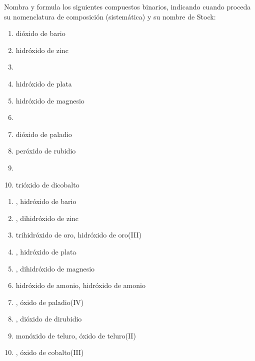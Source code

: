 \documentclass[10pt,a5paper,twoside]{article}
\begin{document}
\begin{exercise}[
    tags    = {inorgánica,compuestos binarios,óxidos,peróxidos,hidróxidos},
    topics  = {química inorgánica,formulación,nomenclatura},
    source  = {SAN Formulación, p27, e33},
  ]
  Nombra y formula los siguientes compuestos binarios, indicando cuando proceda su nomenclatura de composición (sistemática) y su nombre de Stock:

  \begin{enumerate}
    \item dióxido de bario
    \item hidróxido de zinc
    \item {}
    \item hidróxido de plata
    \item hidróxido de magnesio
    \item {}
    \item dióxido de paladio
    \item peróxido de rubidio
    \item {}
    \item trióxido de dicobalto
  \end{enumerate}
\end{exercise}

\begin{solution}
  \begin{enumerate}
    \item {}, hidróxido de bario
    \item {}, dihidróxido de zinc
    \item trihidróxido de oro, hidróxido de oro(III)
    \item {}, hidróxido de plata
    \item {}, dihidróxido de magnesio
    \item hidróxido de amonio, hidróxido de amonio
    \item {}, óxido de paladio(IV)
    \item {}, dióxido de dirubidio
    \item monóxido de teluro, óxido de teluro(II)
    \item {}, óxido de cobalto(III)
  \end{enumerate}
\end{solution}
\end{document}
